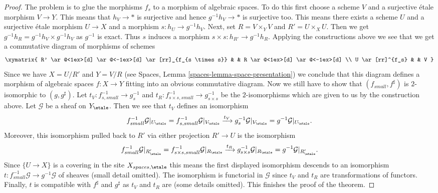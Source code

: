 \begin{proof}
\medskip\noindent
The problem is to glue the morphisms $f_s$ to a morphism of algebraic
spaces. To do this first choose a scheme $V$ and a surjective \'etale
morphism $V \to Y$. This means that $h_V \to *$ is surjective and hence
$g^{-1}h_V \to *$ is surjective too. This means there exists a scheme $U$
and a surjective \'etale morphism $U \to X$ and a morphism
$s : h_U \to g^{-1}h_V$. Next, set $R = V \times_Y V$ and
$R' = U \times_X U$. Then we get
$g^{-1}h_R = g^{-1}h_V \times g^{-1}h_V$ as $g^{-1}$ is exact.
Thus $s$ induces a morphism $s \times s : h_{R'} \to g^{-1}h_R$.
Applying the constructions above we see that we get a
commutative diagram of morphisms of schemes
$$
\xymatrix{
R' \ar@<1ex>[d] \ar@<-1ex>[d] \ar[rr]_{f_{s \times s}} & &
R \ar@<1ex>[d] \ar@<-1ex>[d] \\
U \ar[rr]^{f_s} & &
V
}
$$
Since we have $X = U/R'$ and $Y = V/R$ (see
Spaces, Lemma \ref{spaces-lemma-space-presentation})
we conclude that this diagram
defines a morphism of algebraic spaces $f : X \to Y$ fitting
into an obvious commutative diagram.
Now we still have to show that $(f_{small}, f^\sharp)$ is
$2$-isomorphic to $(g, g^\sharp)$.
Let $t_V : f_{s, small}^{-1} \to g_s^{-1}$ and
$t_R : f_{s \times s, small}^{-1} \to g_{s \times s}^{-1}$ be
the $2$-isomorphisms which are given to us by the construction above.
Let $\mathcal{G}$ be a sheaf on $Y_\etale$. Then we see that
$t_V$ defines an isomorphism
$$
f_{small}^{-1}\mathcal{G}|_{U_\etale}
=
f_{s, small}^{-1}\mathcal{G}|_{V_\etale}
\xrightarrow{t_V}
g_s^{-1}\mathcal{G}|_{V_\etale}
=
g^{-1}\mathcal{G}|_{U_\etale}.
$$
Moreover, this isomorphism pulled back to $R'$ via either projection
$R' \to U$ is the isomorphism
$$
f_{small}^{-1}\mathcal{G}|_{R'_\etale}
=
f_{s \times s, small}^{-1}\mathcal{G}|_{R_\etale}
\xrightarrow{t_R}
g_{s \times s}^{-1}\mathcal{G}|_{R_\etale}
=
g^{-1}\mathcal{G}|_{R'_\etale}.
$$
Since $\{U \to X\}$ is a covering in the site $X_{spaces, \etale}$
this means the first displayed isomorphism descends to an isomorphism
$t : f_{small}^{-1}\mathcal{G} \to g^{-1}\mathcal{G}$
of sheaves (small detail omitted). The isomorphism is functorial
in $\mathcal{G}$ since $t_V$ and $t_R$ are transformations of functors.
Finally, $t$ is compatible with $f^\sharp$ and $g^\sharp$ as
$t_V$ and $t_R$ are (some details omitted).
This finishes the proof of the theorem.
\end{proof}
